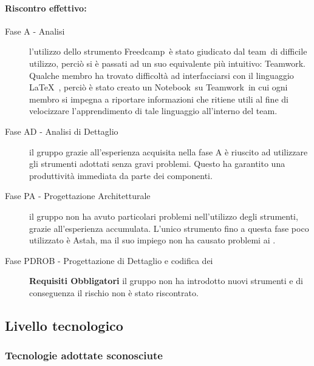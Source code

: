 \documentclass[../PianoProgetto.tex]{subfiles}
\begin{document}
	\paragraph*{Riscontro effettivo:} 
		\begin{description}
			\item[Fase A - Analisi] l'utilizzo dello strumento Freedcamp\g\ è stato giudicato dal team\g\ di difficile utilizzo, perciò si è passati ad un suo equivalente più intuitivo: Teamwork\g .
	Qualche membro ha trovato difficoltà ad interfacciarsi con il linguaggio \LaTeX\  , perciò è stato creato un Notebook\g\ su Teamwork\g\ in cui ogni membro si impegna a riportare informazioni che ritiene utili al fine di velocizzare l'apprendimento di tale linguaggio all'interno del team\g .
			\item[Fase AD - Analisi di Dettaglio] il gruppo grazie all'esperienza acquisita nella fase A è riuscito ad utilizzare gli strumenti adottati senza gravi problemi. Questo ha garantito una produttività immediata da parte dei componenti. 
			\item[Fase PA - Progettazione Architetturale] il gruppo non ha avuto particolari problemi nell'utilizzo degli strumenti, grazie all'esperienza accumulata. L'unico strumento fino a questa fase poco utilizzato è Astah\g, ma il suo impiego non ha causato problemi ai \progettisti.
			\item[Fase PDROB - Progettazione di Dettaglio e codifica dei]
			\textbf{Requisiti Obbligatori} il gruppo non ha introdotto nuovi strumenti e di conseguenza il rischio non è stato riscontrato. \ \\
					 
		\end{description}
		
\newpage
\subsection{Livello tecnologico}

\subsubsection{Tecnologie adottate sconosciute}
\label{sec:Tecnologie adottate sconosciute}
\end{document}
